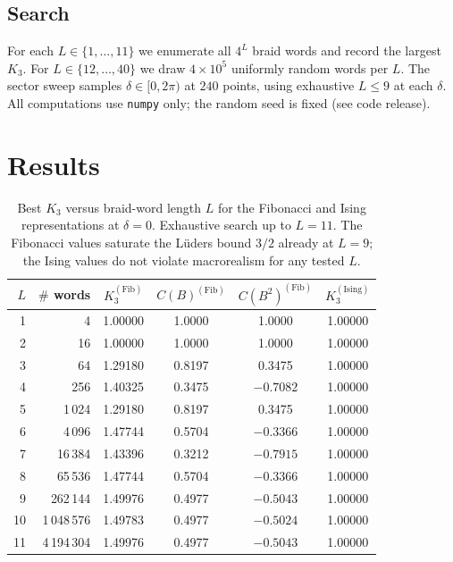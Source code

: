 \documentclass[aps,prx,reprint,amsmath,amssymb,floatfix,nofootinbib,superscriptaddress]{revtex4-2}
\begin{document}
\subsection{Search}

For each $L \in \{1,\ldots,11\}$ we enumerate all $4^{L}$ braid words
and record the largest $K_{3}$. For $L \in \{12,\ldots,40\}$ we draw
$4\times 10^{5}$ uniformly random words per $L$. The sector sweep
samples $\delta \in [0, 2\pi)$ at $240$ points, using exhaustive
$L \leq 9$ at each $\delta$. All computations use
\texttt{numpy} only; the random seed is fixed (see code release).

\section{Results}
\label{sec:results}

\begin{table}
\caption{Best $K_{3}$ versus braid-word length $L$ for the Fibonacci
and Ising representations at $\delta=0$. Exhaustive search up to
$L=11$. The Fibonacci values saturate the L\"uders bound $3/2$
already at $L=9$; the Ising values do not violate macrorealism for
any tested $L$.}
\label{tab:K3_L}
\centering
\begin{tabular}{rrcccc}
\toprule
$L$ & $\#$ words & $K_{3}^{(\mathrm{Fib})}$ & $C(B)^{(\mathrm{Fib})}$
    & $C(B^{2})^{(\mathrm{Fib})}$ & $K_{3}^{(\mathrm{Ising})}$ \\
\midrule
1  & 4         & 1.00000 &  1.0000 &  1.0000 & 1.00000 \\
2  & 16        & 1.00000 &  1.0000 &  1.0000 & 1.00000 \\
3  & 64        & 1.29180 &  0.8197 &  0.3475 & 1.00000 \\
4  & 256       & 1.40325 &  0.3475 & $-0.7082$ & 1.00000 \\
5  & 1\,024    & 1.29180 &  0.8197 &  0.3475 & 1.00000 \\
6  & 4\,096    & 1.47744 &  0.5704 & $-0.3366$ & 1.00000 \\
7  & 16\,384   & 1.43396 &  0.3212 & $-0.7915$ & 1.00000 \\
8  & 65\,536   & 1.47744 &  0.5704 & $-0.3366$ & 1.00000 \\
9  & 262\,144  & 1.49976 &  0.4977 & $-0.5043$ & 1.00000 \\
10 & 1\,048\,576 & 1.49783 & 0.4977 & $-0.5024$ & 1.00000 \\
11 & 4\,194\,304 & 1.49976 & 0.4977 & $-0.5043$ & 1.00000 \\
\bottomrule
\end{tabular}
\end{table}
\end{document}
